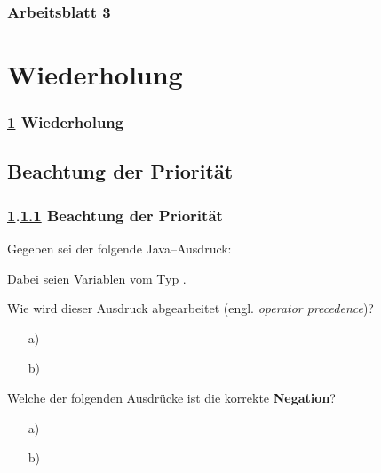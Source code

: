 \documentclass[9pt,german]{beamer}%
\begin{document}
\maketitle%
\addtocounter{framenumber}{-1}%


\begin{frame}
  \frametitle{Arbeitsblatt 3}%
\tableofcontents[hideallsubsections]
\end{frame}
\setcounter{exercise}{12}



\section{Wiederholung}\label{K:wdh}
\begin{frame}
  \frametitle{\ref{K:wdh} Wiederholung}%
\tableofcontents[current]
\end{frame}


\def\stitle{Beachtung der Priorit\"at}
\subsection{\stitle}\label{S:Priorit\"at}
\begin{frame}[fragile]%
  \frametitle{\ref{K:wdh}.\ref{S:Priorit\"at} \stitle}%
\medskip

Gegeben sei der folgende Java--Ausdruck:
\begin{center}
\end{center}
Dabei seien  Variablen vom Typ .
\medskip

Wie wird dieser Ausdruck abgearbeitet (engl. \emph{operator precedence})?
\begin{itemize}
  \item [a)] 
  \item[b)] 
\end{itemize}

Welche der folgenden Ausdr\"ucke ist die korrekte \textbf{Negation}?
\begin{itemize}
  \item [a)] 
  \item [b)] 
\end{itemize}

\end{frame}
\end{document}
